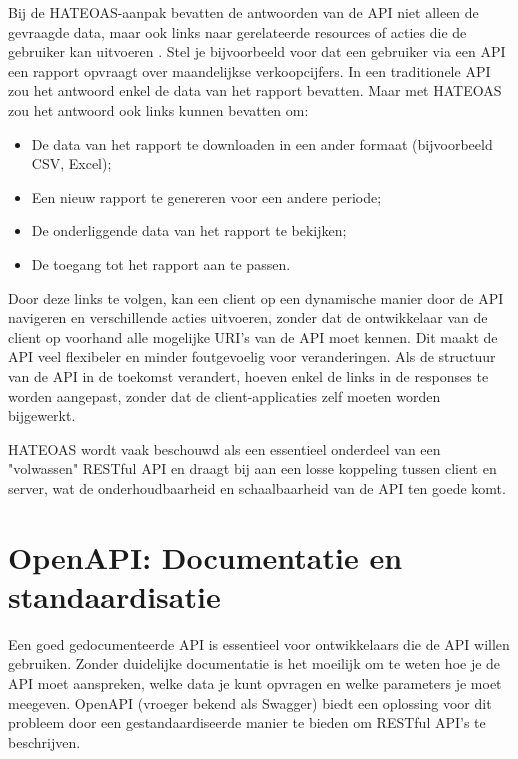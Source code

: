 \bigskip

Bij de HATEOAS-aanpak bevatten de antwoorden van de API niet alleen de gevraagde data, maar ook links naar gerelateerde resources of acties die de gebruiker kan uitvoeren \autocite{Aydemir_2022}. Stel je bijvoorbeeld voor dat een gebruiker via een API een rapport opvraagt over maandelijkse verkoopcijfers. In een traditionele API zou het antwoord enkel de data van het rapport bevatten. Maar met HATEOAS zou het antwoord ook links kunnen bevatten om:

\begin{itemize}
  \item De data van het rapport te downloaden in een ander formaat (bijvoorbeeld CSV, Excel);
  \item Een nieuw rapport te genereren voor een andere periode;
  \item De onderliggende data van het rapport te bekijken;
  \item De toegang tot het rapport aan te passen.
\end{itemize}

\bigskip

Door deze links te volgen, kan een client op een dynamische manier door de API navigeren en verschillende acties uitvoeren, zonder dat de ontwikkelaar van de client op voorhand alle mogelijke URI's van de API moet kennen. Dit maakt de API veel flexibeler en minder foutgevoelig voor veranderingen. Als de structuur van de API in de toekomst verandert, hoeven enkel de links in de responses te worden aangepast, zonder dat de client-applicaties zelf moeten worden bijgewerkt.

\bigskip

HATEOAS wordt vaak beschouwd als een essentieel onderdeel van een "volwassen" RESTful API en draagt bij aan een losse koppeling tussen client en server, wat de onderhoudbaarheid en schaalbaarheid van de API ten goede komt.

\section{OpenAPI: Documentatie en standaardisatie}

Een goed gedocumenteerde API is essentieel voor ontwikkelaars die de API willen gebruiken. Zonder duidelijke documentatie is het moeilijk om te weten hoe je de API moet aanspreken, welke data je kunt opvragen en welke parameters je moet meegeven. OpenAPI (vroeger bekend als Swagger) biedt een oplossing voor dit probleem door een gestandaardiseerde manier te bieden om RESTful API's te beschrijven.

